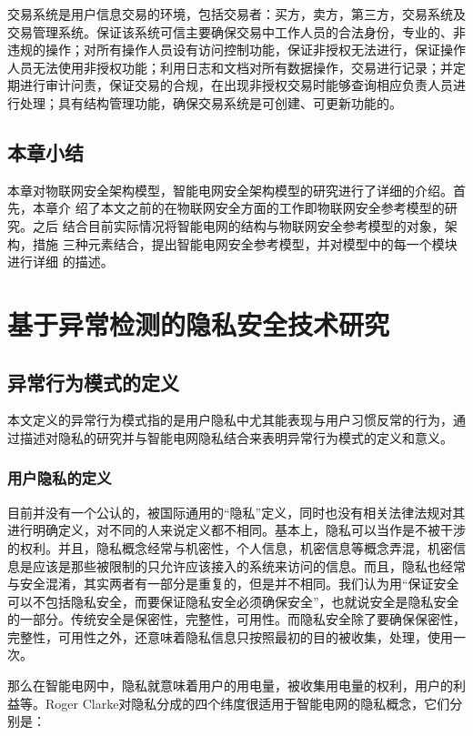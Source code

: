 \documentclass[10.5pt,twocolumn]{jbuaa}
\begin{document}
交易系统是用户信息交易的环境，包括交易者：买方，卖方，第三方，交易系统及交易管理系统。保证该系统可信主要确保交易中工作人员的合法身份，专业的、非违规的操作；对所有操作人员设有访问控制功能，保证非授权无法进行，保证操作人员无法使用非授权功能；利用日志和文档对所有数据操作，交易进行记录；并定期进行审计问责，保证交易的合规，在出现非授权交易时能够查询相应负责人员进行处理；具有结构管理功能，确保交易系统是可创建、可更新功能的。

\subsection{本章小结}
本章对物联网安全架构模型，智能电网安全架构模型的研究进行了详细的介绍。首先，本章介
绍了本文之前的在物联网安全方面的工作即物联网安全参考模型的研究。之后
结合目前实际情况将智能电网的结构与物联网安全参考模型的对象，架构，措施
三种元素结合，提出智能电网安全参考模型，并对模型中的每一个模块进行详细
的描述。

\section{基于异常检测的隐私安全技术研究}
\subsection{异常行为模式的定义}
本文定义的异常行为模式指的是用户隐私中尤其能表现与用户习惯反常的行为，通过描述对隐私的研究并与智能电网隐私结合来表明异常行为模式的定义和意义。

\subsubsection{用户隐私的定义}
目前并没有一个公认的，被国际通用的“隐私”定义，同时也没有相关法律法规对其进行明确定义，对不同的人来说定义都不相同。基本上，隐私可以当作是不被干涉的权利。并且，隐私概念经常与机密性，个人信息，机密信息等概念弄混，机密信息是应该是那些被限制的只允许应该接入的系统来访问的信息。而且，隐私也经常与安全混淆，其实两者有一部分是重复的，但是并不相同。我们认为用“保证安全可以不包括隐私安全，而要保证隐私安全必须确保安全”，也就说安全是隐私安全的一部分。传统安全是保密性，完整性，可用性。而隐私安全除了要确保保密性，完整性，可用性之外，还意味着隐私信息只按照最初的目的被收集，处理，使用一次。

那么在智能电网中，隐私就意味着用户的用电量，被收集用电量的权利，用户的利益等。Roger Clarke对隐私分成的四个纬度很适用于智能电网的隐私概念，它们分别是：
\end{document}
